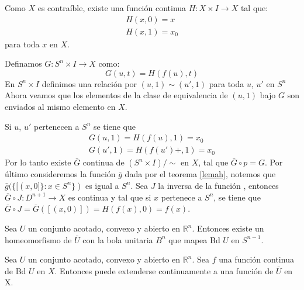 \begin{Dem}

Como $X$ es contraíble, existe una función continua $H\colon X\times I \rightarrow X$ tal que:
\begin{eqnarray}
H(x,0)=x \\
H(x,1) = x_0
\end{eqnarray}
para toda $x$ en $X$.

Definamos $G\colon S^n\times I \rightarrow X$ como:
\begin{equation}
G(u,t) = H(f(u),t)
\end{equation}
En $S^n\times I$ definimos una relación por $(u,1)\sim(u',1)$ para toda $u$, $u'$ en $S^n$
Ahora veamos que los elementos de la clase de equivalencia de $(u,1)$ bajo $G$ son enviados al mismo elemento en $X$.

Si $u$, $u'$ pertenecen a $S^n$ se tiene que
\begin{eqnarray}
G(u,1) = H(f(u),1) = x_0\\
G(u',1)=H(f(u')+,1) = x_0
\end{eqnarray}
Por lo tanto existe $\bar{G}$ continua de $(S^n\times I) /{\sim}$ en $X$, tal que $\bar{G}\circ p = G$.
Por último consideremos la función $\bar{g}$ dada por el teorema \ref{lemah}, notemos que $\bar{g}(\{[(x,0]\}\colon x\in S^n\})$ es igual a $S^n$. Sea $J$ la inversa de la función  , entonces $\bar{G}\circ J \colon D^{n+1}\rightarrow X$ es continua y tal que si $x$ pertenece a $S^n$, se tiene que $\bar{G}\circ J = \bar{G}([(x,0)])= H(f(x),0) = f(x)$.
\end{Dem}

\begin{Teo}
Sea $U$ un conjunto acotado, convexo y abierto en $\mathbb{R}^n$. Entonces existe un homeomorfismo de $\bar{U}$ con la bola unitaria $B^n$ que mapea Bd $U$ en $S^{n-1}$.
\end{Teo}

\begin{Teo}\label{ext_general}
Sea $U$ un conjunto acotado, convexo y abierto en $\mathbb{R}^n$. Sea $f$ una función continua de Bd $U$ en $X$. Entonces  puede extenderse continuamente a una función de $\bar{U}$ en X.
\end{Teo}
